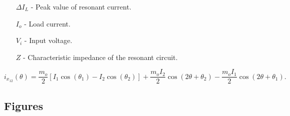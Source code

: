 \documentclass[letterpaper,oneside,onecolumn,draftclsnofoot,12pt,conference]{IEEEtran}
\begin{document}
 \begin{enumerate}
 	\item[$\Delta I_{L}$]  - Peak value of resonant current.
 	\item[$I_{o}$]  - Load current.
 	\item[$V_{i}$]  - Input voltage.
 	\item[$Z$]  - Characteristic impedance of the resonant circuit.
 \end{enumerate}
 
  \begin{equation} \label{eq:ix12}
  {i_{{x_{12}}}}\left( \theta  \right) = \frac{{{m_o}}}{2}\left[ {{I_1}\cos \left( {{\theta _1}} \right) - {I_2}\cos \left( {{\theta _2}} \right)} \right]
  + \frac{{{m_o}{I_2}}}{2}\cos \left( {2\theta  + {\theta _2}} \right) - \frac{{{m_o}{I_1}}}{2}\cos \left( {2\theta  + {\theta _1}} \right).	
  \end{equation}
  
  
 \subsection{Figures}
 
\end{document}
